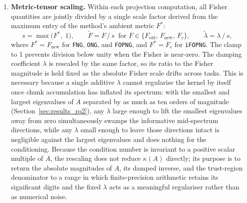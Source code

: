 \begin{enumerate}
    \item \textbf{Metric-tensor scaling.}
        Within each projection computation, all Fisher quantities are
        jointly divided by a single scale factor derived from the
        maximum entry of the method's ambient metric $F^*$:
        \begin{equation}
            s = \max\bigl(F^*,\; 1\bigr),
            \qquad
            \tilde{F} = F \,/\, s
            \;\;\text{for } F \in \bigl\{F_{\mathrm{old}},\,
            F_{\mathrm{new}},\, F_c\bigr\},
            \qquad \tilde{\lambda} = \lambda \,/\, s,
            \label{eq:scaling}
        \end{equation}
        where $F^* = F_{\mathrm{new}}$ for \texttt{FNG}, \texttt{ONG},
        and \texttt{FOPNG}, and $F^* = F_c$ for \texttt{iFOPNG}.
        The clamp to 1 prevents division below unity when the Fisher is
        near-zero.
        The damping coefficient $\lambda$ is rescaled by the same factor,
        so its ratio to the Fisher magnitude is held fixed as the absolute
        Fisher scale drifts across tasks. This is necessary because a
        single additive $\lambda$ cannot regularise the kernel by itself
        once chunk accumulation has inflated its spectrum: with the
        smallest and largest eigenvalues of $A$ separated by as much as ten
        orders of magnitude (Section~\ref{sec:results_rq2}), any $\lambda$
        large enough to lift the smallest eigenvalues away from zero
        simultaneously swamps the informative mid-spectrum directions,
        while any $\lambda$ small enough to leave those directions intact
        is negligible against the largest eigenvalues and does nothing for
        the conditioning. Because the condition number is invariant to a
        positive scalar multiple of $A$, the rescaling does not reduce
        $\kappa(A)$ directly; its purpose is to return the absolute
        magnitudes of $A$, its damped inverse, and the trust-region
        denominator to a range in which finite-precision arithmetic
        retains its significant digits and the fixed $\lambda$ acts as a
        meaningful regulariser rather than as numerical noise. 
\end{enumerate}

